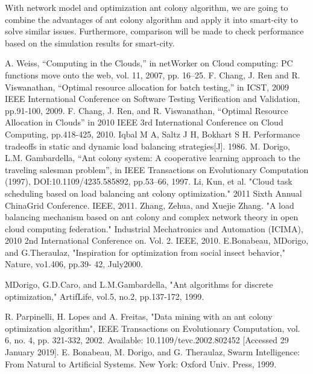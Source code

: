 \documentclass[conference]{IEEEtran}
\begin{document}
With network model and optimization ant colony algorithm, we are going to combine the advantages of ant colony algorithm and apply it into smart-city to solve similar issues. Furthermore, comparison will be made to check performance based on the simulation results for smart-city.


\begin{thebibliography}{00}
  A. Weiss, ``Computing in the Clouds,'' in  netWorker on Cloud computing: PC functions move onto the web, vol. 11, 2007, pp. 16--25.
 F. Chang, J. Ren and R. Viswanathan, ``Optimal resource allocation for batch testing,'' in ICST, 2009 IEEE International Conference on Software Testing Verification and Validation, pp.91-100, 2009.
 F. Chang, J. Ren, and R. Viswanathan, “Optimal Resource Allocation in Clouds” in 2010 IEEE 3rd International Conference on Cloud Computing, pp.418-425, 2010.
 Iqbal M A, Saltz J H, Bokhart S H. Performance tradeoffs in static and dynamic load balancing strategies[J]. 1986.
 M. Dorigo, L.M. Gambardella, “Ant colony system: A cooperative learning approach to the traveling salesman problem”, in IEEE Transactions on Evolutionary Computation (1997), DOI:10.1109/4235.585892, pp.53–66, 1997.
Li, Kun, et al. "Cloud task scheduling based on load balancing ant colony optimization." 2011 Sixth Annual ChinaGrid Conference. IEEE, 2011.
 Zhang, Zehua, and Xuejie Zhang. "A load balancing mechanism based on ant colony and complex network theory in open cloud computing federation." Industrial Mechatronics and Automation (ICIMA), 2010 2nd International Conference on. Vol. 2. IEEE, 2010.
 E.Bonabeau, MDorigo, and G.Theraulaz, "Inspiration for
optimization from social insect behavior," Nature, vo1.406, pp.39-
42, July2000.

 MDorigo, G.D.Caro, and L.M.Gambardella, "Ant algorithms for
discrete optimization," ArtifLife, vol.5, no.2, pp.137-172, 1999.

 R. Parpinelli, H. Lopes and A. Freitas, "Data mining with an ant colony optimization algorithm", IEEE Transactions on Evolutionary Computation, vol. 6, no. 4, pp. 321-332, 2002. Available: 10.1109/tevc.2002.802452 [Accessed 29 January 2019].
 E. Bonabeau, M. Dorigo, and G. Theraulaz, Swarm Intelligence: From
Natural to Artificial Systems. New York: Oxford Univ. Press, 1999.

\end{thebibliography}
\end{document}
